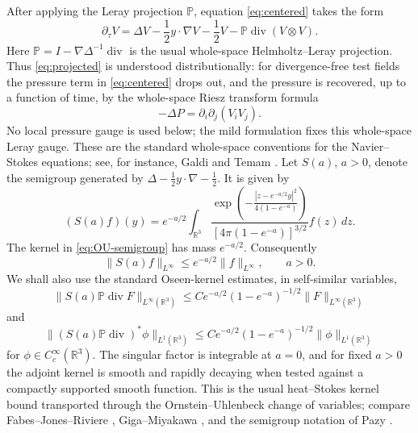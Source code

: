 \documentclass[11pt]{amsart}
\theoremstyle{plain}
\theoremstyle{definition}
\theoremstyle{remark}
\numberwithin{equation}{section}
\begin{document}
After applying the Leray projection \(\mathbb P\), equation \eqref{eq:centered}
takes the form
\begin{equation}\label{eq:projected}
   \partial_\tau V
   =
   \Delta V-\frac12y\cdot\nabla V-\frac12V
   -\mathbb P\operatorname{div}(V\otimes V).
\end{equation}
Here \(\mathbb P=I-\nabla\Delta^{-1}\operatorname{div}\) is the usual
whole-space Helmholtz--Leray projection.  Thus \eqref{eq:projected} is
understood distributionally: for divergence-free test fields the pressure term
in \eqref{eq:centered} drops out, and the pressure is recovered, up to a
function of time, by the whole-space Riesz transform formula
\[
   -\Delta P=\partial_i\partial_j(V_iV_j).
\]
No local pressure gauge is used below; the mild formulation fixes this
whole-space Leray gauge.  These are the standard whole-space conventions for
the Navier--Stokes equations; see, for instance, Galdi \cite{Galdi2011} and
Temam \cite{Temam1995}.
Let \(S(a)\), \(a>0\), denote the semigroup generated by
\(\Delta-\frac12y\cdot\nabla-\frac12\).  It is given by
\begin{equation}\label{eq:OU-semigroup}
   (S(a)f)(y)
   =
   e^{-a/2}
   \int_{\mathbb R^3}
   \frac{\exp\!\left(-\frac{|z-e^{-a/2}y|^2}{4(1-e^{-a})}\right)}
        {[4\pi(1-e^{-a})]^{3/2}}
   f(z)\,dz .
\end{equation}
The kernel in \eqref{eq:OU-semigroup} has mass \(e^{-a/2}\).  Consequently
\[
   \|S(a)f\|_{L^\infty}\le e^{-a/2}\|f\|_{L^\infty},
   \qquad a>0.
\]
We shall also use the standard Oseen-kernel estimates, in self-similar
variables,
\begin{equation}\label{eq:stokes-Linfty-estimate}
   \|S(a)\mathbb P\operatorname{div}F\|_{L^\infty(\mathbb R^3)}
   \le
   C e^{-a/2}(1-e^{-a})^{-1/2}
   \|F\|_{L^\infty(\mathbb R^3)}
\end{equation}
and
\begin{equation}\label{eq:stokes-adjoint-test-estimate}
   \|(S(a)\mathbb P\operatorname{div})^*\phi\|_{L^1(\mathbb R^3)}
   \le
   C e^{-a/2}(1-e^{-a})^{-1/2}\|\phi\|_{L^1(\mathbb R^3)}
\end{equation}
for \(\phi\in C_c^\infty(\mathbb R^3)\).  The singular factor is integrable at
\(a=0\), and for fixed \(a>0\) the adjoint kernel is smooth and rapidly
decaying when tested against a compactly supported smooth function.  This is
the usual heat--Stokes kernel bound transported through the Ornstein--Uhlenbeck
change of variables; compare Fabes--Jones--Riviere
\cite{FabesJonesRiviere1972}, Giga--Miyakawa \cite{GigaMiyakawa1985}, and the
semigroup notation of Pazy \cite{Pazy1983}.
\end{document}
